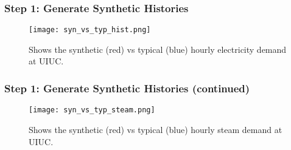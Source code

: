 \begin{frame}
  \frametitle{Step 1: Generate Synthetic Histories}
    \begin{figure}
      \centering
      \texttt{[image: syn\_vs\_typ\_hist.png]}
      \caption{Shows the synthetic (red) vs typical (blue) hourly electricity demand at UIUC.}
      \label{fig:syndemand}
    \end{figure}
\end{frame}
\begin{frame}
  \frametitle{Step 1: Generate Synthetic Histories (continued)}
  \begin{figure}
    \centering
    \texttt{[image: syn\_vs\_typ\_steam.png]}
    \caption{Shows the synthetic (red) vs typical (blue) hourly steam demand at UIUC.}
    \label{fig:synsteam}
  \end{figure}
\end{frame}
